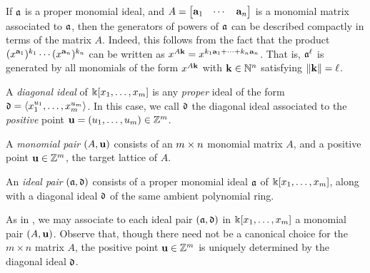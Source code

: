 \documentclass[11pt]{amsart}
\begin{document}
\begin{remark}
   \label{generators-via-exponent-matrix: R}  If $\mathfrak{a}$ is a proper monomial ideal, and $A= \begin{bmatrix} \mathbf{a}_1 & \cdots & \mathbf{a}_n \end{bmatrix}$ is a monomial matrix associated to $\mathfrak{a}$, then the generators of powers of $\mathfrak{a}$ can be described compactly in terms of the matrix $A$.
   Indeed, this follows from the fact that the product $(x^{\mathbf{a}_1})^{k_1} \cdots (x^{\mathbf{a}_n})^{k_n}$ can be written as $x^{A \mathbf{k}} = x^{k_1 \mathbf{a}_1 + \cdots + k_n \mathbf{a}_n}$.
   That is, $\mathfrak{a}^\ell$ is generated by all monomials of the form $x^{A \mathbf{k}}$ with $\mathbf{k} \in \mathbb{N}^n$ satisfying $\| \mathbf{k} \| = \ell$.
%
\end{remark}



\begin{definition}  A  \emph{diagonal ideal} of $\Bbbk[x_1, \ldots, x_{m}]$ is any \emph{proper} ideal of the form $\mathfrak{d} = \langle x_1^{u_1}, \ldots, x_{m}^{u_{m}} \rangle$.  In this case,  we call $\mathfrak{d}$ the diagonal ideal associated to the \emph{positive} point $\mathbf{u} = (u_1, \ldots, u_{m}) \in \mathbb{Z}^{m}$.
\end{definition}

\begin{definition}[Pairs]  
\label{pairs: D}
   A \emph{monomial pair} $(A, \mathbf{u})$ consists of an $m \times n$ monomial matrix $A$, and a positive point $\mathbf{u} \in \mathbb{Z}^m$, the target lattice of $A$.  
   
   An \emph{ideal pair} $(\mathfrak{a}, \mathfrak{d})$ consists of a proper monomial ideal $\mathfrak{a}$ of $\Bbbk[x_1, \ldots, x_{m}]$, along with a diagonal ideal $\mathfrak{d}$ of the same ambient polynomial ring.
\end{definition}

\begin{remark}
\label{associate of pairs: R}
 As in , we may associate to each ideal pair $(\mathfrak{a}, \mathfrak{d})$ in $\Bbbk[x_1, \ldots, x_{m}]$ a monomial pair $(A, \mathbf{u})$.  Observe that, though there need not be a canonical choice for the $m \times n$ matrix $A$, the positive point $\mathbf{u} \in \mathbb{Z}^m$ is uniquely determined by the diagonal ideal $\mathfrak{d}$.
\end{remark}
\end{document}
